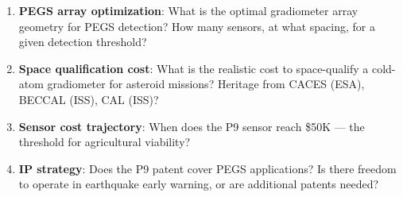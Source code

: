 \documentclass[11pt]{article}
\theoremstyle{definition}
\theoremstyle{remark}
\begin{document}
\begin{enumerate}
  \item \textbf{PEGS array optimization}: What is the optimal
    gradiometer array geometry for PEGS detection? How many sensors,
    at what spacing, for a given detection threshold?
  \item \textbf{Space qualification cost}: What is the realistic
    cost to space-qualify a cold-atom gradiometer for asteroid missions?
    Heritage from CACES (ESA), BECCAL (ISS), CAL (ISS)?
  \item \textbf{Sensor cost trajectory}: When does the P9 sensor
    reach \$50K --- the threshold for agricultural viability?
  \item \textbf{IP strategy}: Does the P9 patent cover PEGS
    applications? Is there freedom to operate in earthquake
    early warning, or are additional patents needed?
\end{enumerate}
\end{document}
